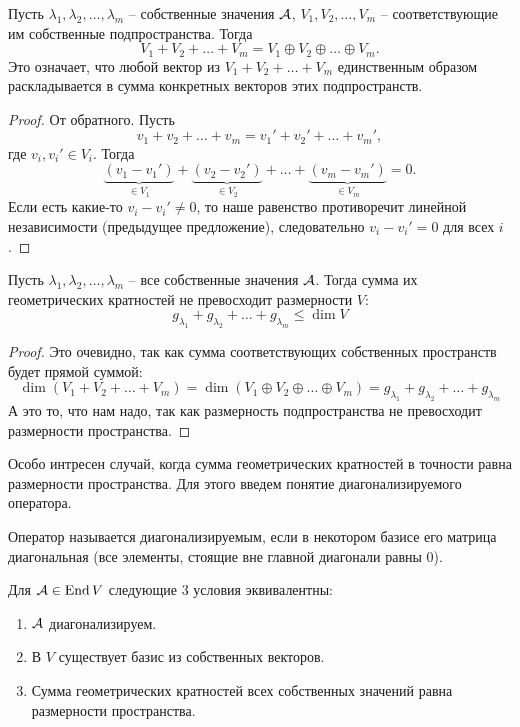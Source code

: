 \begin{follow}
    Пусть $\lambda_1, \lambda_2, \dots, \lambda_m$ -- собственные значения $\mathcal{A}$, $V_1, V_2, \dots, V_m$ -- соответствующие им собственные подпространства.
    Тогда \[ V_1 + V_2 + \dots + V_m = V_1 \oplus V_2 \oplus \dots \oplus V_m. \] 
    Это означает, что любой вектор из $V_1 + V_2 + \dots + V_m$ единственным образом раскладывается в сумма конкретных векторов этих подпространств.
\end{follow}

\begin{proof}
    От обратного. Пусть \[ v_1 + v_2 + \dots + v_m = v_1' + v_2' + \dots + v_m', \]
    \quad где $v_i, v_i' \in V_i$.
    Тогда \[ \underbrace{(v_1 - v_1')}_{\in V_1} + \underbrace{(v_2 - v_2')}_{\in V_2} + \dots + \underbrace{(v_m - v_m')}_{\in V_m} = 0. \]
    \quad Если есть какие-то $v_i - v_i' \neq 0$, то наше равенство противоречит линейной независимости (предыдущее предложение), следовательно $v_i - v_i' = 0$ для всех $i$.
\end{proof}

\begin{follow}
    Пусть $\lambda_1, \lambda_2, \dots, \lambda_m$ -- все собственные значения $\mathcal{A}$. 
    Тогда сумма их геометрических кратностей не превосходит размерности $V$:
    \[ g_{\lambda_1} + g_{\lambda_2} + \dots + g_{\lambda_m} \leqslant \dim V \]
\end{follow}
\begin{proof}
    Это очевидно, так как сумма соответствующих собственных пространств будет прямой суммой:
    \[ \dim(V_1 + V_2 + \dots + V_m) 
    = \dim(V_1 \oplus V_2 \oplus \dots \oplus V_m)
    =  g_{\lambda_1} + g_{\lambda_2} + \dots + g_{\lambda_m} \]
    \quad А это то, что нам надо, так как размерность подпространства не превосходит размерности пространства.
\end{proof}
\vspace{5mm}

Особо интресен случай, когда сумма геометрических кратностей в точности равна размерности пространства.
Для этого введем понятие диагонализируемого оператора.
\begin{conj}
    Оператор называется диагонализируемым, если в некотором базисе его матрица диагональная 
    (все элементы, стоящие вне главной диагонали равны 0).
\end{conj}

\begin{theorem-non}
    Для $\mathcal{A} \in \operatorname{End} V$ следующие 3 условия эквивалентны:
    \begin{enumerate}
        \item $\mathcal{A}$ диагонализируем.
        \item В $V$ существует базис из собственных векторов.
        \item Сумма геометрических кратностей всех собственных значений равна размерности пространства.
    \end{enumerate} 
\end{theorem-non}

